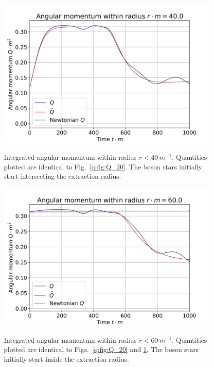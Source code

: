 \begin{figure}[h!]
{\includegraphics[width=0.6\columnwidth]{png/Qplot_40.0.png}}
\caption{ Integrated angular momentum within radius $r<40 ~m^{-1}$. Quantities plotted are identical to Fig.~\ref{q:fig:Q_20}. The boson stars initially start intersecting the extraction radius.  }
\label{q:fig:Q_40}
\end{figure}

\begin{figure}[h!]
{\includegraphics[width=0.6\columnwidth]{png/Qplot_60.0.png}}
\caption{ Integrated angular momentum within radius $r<60 ~m^{-1}$. Quantities plotted are identical to Figs.~\ref{q:fig:Q_20} and \ref{q:fig:Q_40}. The boson stars initially start inside the extraction radius.  }
\label{q:fig:Q_60}
\end{figure}


